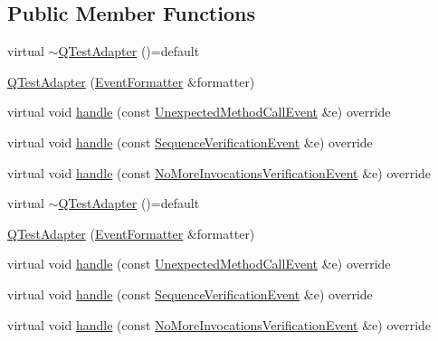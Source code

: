 \subsection*{Public Member Functions}
\begin{DoxyCompactItemize}
\item 
virtual \mbox{\hyperlink{classfakeit_1_1QTestAdapter_a43d155b9471ea2d27967a15e31d46fbb}{$\sim$\+Q\+Test\+Adapter}} ()=default
\item 
\mbox{\hyperlink{classfakeit_1_1QTestAdapter_af227113a871115f8af2e6cc7f09b9028}{Q\+Test\+Adapter}} (\mbox{\hyperlink{structfakeit_1_1EventFormatter}{Event\+Formatter}} \&formatter)
\item 
virtual void \mbox{\hyperlink{classfakeit_1_1QTestAdapter_a73e77ade8e08ed69ee1f510d21de4d4e}{handle}} (const \mbox{\hyperlink{structfakeit_1_1UnexpectedMethodCallEvent}{Unexpected\+Method\+Call\+Event}} \&e) override
\item 
virtual void \mbox{\hyperlink{classfakeit_1_1QTestAdapter_a2f2a25ac2b148f4631a753110eddeb52}{handle}} (const \mbox{\hyperlink{structfakeit_1_1SequenceVerificationEvent}{Sequence\+Verification\+Event}} \&e) override
\item 
virtual void \mbox{\hyperlink{classfakeit_1_1QTestAdapter_a69748754023939bc9c5421bec4f9f44e}{handle}} (const \mbox{\hyperlink{structfakeit_1_1NoMoreInvocationsVerificationEvent}{No\+More\+Invocations\+Verification\+Event}} \&e) override
\item 
virtual \mbox{\hyperlink{classfakeit_1_1QTestAdapter_a43d155b9471ea2d27967a15e31d46fbb}{$\sim$\+Q\+Test\+Adapter}} ()=default
\item 
\mbox{\hyperlink{classfakeit_1_1QTestAdapter_af227113a871115f8af2e6cc7f09b9028}{Q\+Test\+Adapter}} (\mbox{\hyperlink{structfakeit_1_1EventFormatter}{Event\+Formatter}} \&formatter)
\item 
virtual void \mbox{\hyperlink{classfakeit_1_1QTestAdapter_a73e77ade8e08ed69ee1f510d21de4d4e}{handle}} (const \mbox{\hyperlink{structfakeit_1_1UnexpectedMethodCallEvent}{Unexpected\+Method\+Call\+Event}} \&e) override
\item 
virtual void \mbox{\hyperlink{classfakeit_1_1QTestAdapter_a2f2a25ac2b148f4631a753110eddeb52}{handle}} (const \mbox{\hyperlink{structfakeit_1_1SequenceVerificationEvent}{Sequence\+Verification\+Event}} \&e) override
\item 
virtual void \mbox{\hyperlink{classfakeit_1_1QTestAdapter_a69748754023939bc9c5421bec4f9f44e}{handle}} (const \mbox{\hyperlink{structfakeit_1_1NoMoreInvocationsVerificationEvent}{No\+More\+Invocations\+Verification\+Event}} \&e) override
\end{DoxyCompactItemize}


